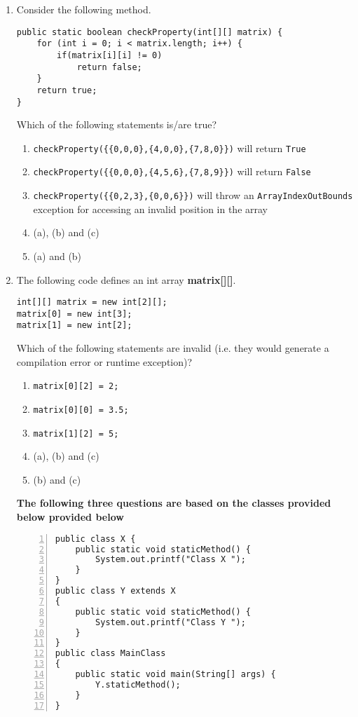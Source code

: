 \documentclass[CS180-S16-FinalExam.tex]{subfiles}
\begin{document}
\begin{enumerate}
\item Consider the following method.
\begin{lstlisting}
public static boolean checkProperty(int[][] matrix) {
	for (int i = 0; i < matrix.length; i++) {
    	if(matrix[i][i] != 0)
        	return false;
    }
    return true;
}
\end{lstlisting}
Which of the following statements is/are true?
\begin{enumerate}
\item \texttt{checkProperty(\{\{0,0,0\},\{4,0,0\},\{7,8,0\}\})} will return \texttt{True}
\item \texttt{checkProperty(\{\{0,0,0\},\{4,5,6\},\{7,8,9\}\})} will return \texttt{False}
\item \texttt{checkProperty(\{\{0,2,3\},\{0,0,6\}\})} will throw an \texttt{ArrayIndexOutBounds} exception for accessing an invalid position in the array
\item (a), (b) and (c)
\item (a) and (b)  \ifdraft \Ans \fi
\end{enumerate}

\item The following code defines an int array \textbf{matrix[][]}.
\begin{lstlisting}
int[][] matrix = new int[2][];
matrix[0] = new int[3];
matrix[1] = new int[2];
\end{lstlisting}
Which of the following statements are invalid (i.e. they would generate a compilation error or runtime exception)?
\begin{enumerate}
\item \texttt{matrix[0][2] = 2;}
\item \texttt{matrix[0][0] = 3.5;}
\item \texttt{matrix[1][2] = 5;}
\item (a), (b) and (c)
\item (b) and (c) \ifdraft \Ans \fi
\end{enumerate}

\clearpage
\textbf{The following three questions are based on the classes provided below provided below}
\begin{lstlisting}[numbers=left]
public class X {
    public static void staticMethod() {
        System.out.printf("Class X ");
    }
} 
public class Y extends X
{
    public static void staticMethod() {
   		System.out.printf("Class Y ");
    }
}
public class MainClass
{
    public static void main(String[] args) {
        Y.staticMethod();
    }
}
\end{lstlisting}


\end{enumerate}
\end{document}
